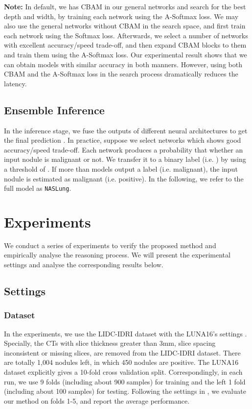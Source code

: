 \documentclass[final,5p,times,twocolumn]{elsarticle}
\begin{document}
\textbf{Note:} In default, we has CBAM in our general networks and search for the best depth and width, by training each network using the A-Softmax loss. We may also use the general networks without CBAM in the search space, and first train each network using the Softmax loss. Afterwards, we select a number of networks with excellent  accuracy/speed trade-off, and then expand CBAM blocks to them and train them using the A-Softmax loss. Our experimental result shows that we can obtain models with similar accuracy in both manners. However, using both CBAM and the A-Softmax loss in the search process dramatically reduces the latency.  




\subsection{Ensemble Inference}
\label{ssec:inference}

In the inference stage, we fuse the outputs of different neural architectures to get the final prediction  \citep{DeepForest}. In practice, suppose we select  networks which shows good accuracy/speed trade-off. Each network produces a probability that whether an input nodule is malignant or not. We transfer it to a binary label (i.e. ) by using a threshold of . If more than  models output a label  (i.e. malignant), the input nodule is estimated as malignant (i.e. positive). In the following, we refer to the full model as \texttt{NASLung}. 






\section{Experiments}
\label{sec:exp}

We conduct a series of experiments to verify the proposed method and empirically analyse the reasoning process. We will present the experimental settings and analyse the corresponding results below. 

\subsection{Settings}
\label{ssec:exp_settings}

\subsubsection{Dataset} 
\label{ssec:exp_data}
In the experiments, we use the LIDC-IDRI dataset \citep{armato2015LIDCdata, armato2011LIDCpub} with the LUNA16's settings \citep{kuan2017deep}. Specially, the CTs with slice thickness greater than 3mm, slice spacing inconsistent or missing slices, are removed from the LIDC-IDRI dataset. There are totally 1,004 nodules left, in which 450 nodules are positive. The LUNA16 dataset explicitly gives a 10-fold cross validation split. Correspondingly, in each run, we use 9 folds (including about 900 samples) for training and the left 1 fold (including about 100 samples) for testing. Following the settings in \citep{zhu2018deeplung}, we evaluate our method on folds 1-5, and report the average performance. 
\end{document}
